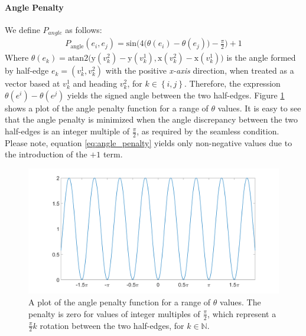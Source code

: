 \paragraph{Angle Penalty}
\label{paragraph:angle_penalty_function_method}
We define $P_{angle}$ as follows:
\begin{equation}\label{eq:angle_penalty}
\begin{split}
P_{\mathrm{angle}}\left(e_i,e_j\right) = \mathrm{sin} \bigg( 4\Big(\theta\left(e_i\right) - \theta\left(e_j\right)\Big) - \frac{\pi}{2}\bigg) + 1
\end{split}
\end{equation}
Where $\theta\left(e_k\right) = \mathrm{atan2}\Big(\mathrm{y}\left(v_k^2\right) - \mathrm{y}\left(v_k^1\right), \mathrm{x}\left(v_k^2\right) - \mathrm{x}\left(v_k^1\right)\Big)$ is the angle formed by half-edge $e_k = \left(v^1_k, v^2_k\right)$ with the positive \emph{x-axis} direction, when treated as a vector based at $v_k^1$ and heading $v_k^2$, for $k \in \left\{i,j\right\}$. Therefore, the expression $\theta\left(e^i\right) - \theta\left(e^j\right)$ yields the signed angle between the two half-edges. Figure \ref{fig:angle_penalty} shows a plot of the angle penalty function for a range of $\theta$ values. It is easy to see that the angle penalty is minimized when the angle discrepancy between the two half-edges is an integer multiple of $\frac{\pi}{2}$, as required by the seamless condition. Please note, equation \ref{eq:angle_penalty} yields only non-negative values due to the introduction of the $+1$ term.
\begin{figure}[ht]
\centering
\includegraphics[width=12cm]{figures/seamless/angle_penalty_function.png}
\caption[The Angle Penalty Function]{A plot of the angle penalty function for a range of $\theta$ values. The penalty is zero for values of integer multiples of $\frac{\pi}{2}$, which represent a $\frac{\pi}{2}k$ rotation between the two half-edges, for $k \in \mathbb{N}$.}
\label{fig:angle_penalty}
\end{figure}
